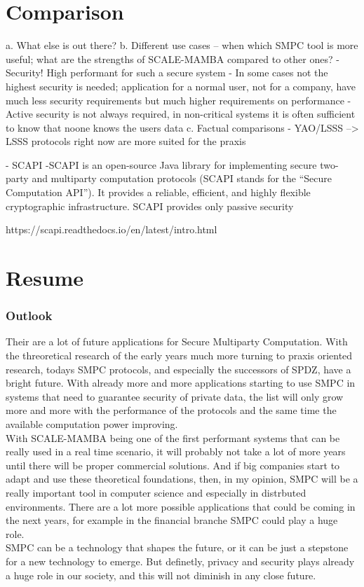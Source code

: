 \documentclass[english,runningheads,a4paper]{llncs}[2018/03/10]
\begin{document}
\section{Comparison}\label{sec:comparison}


a.	What else is out there?
b.	Different use cases – when which SMPC tool is more useful; what are the strengths of SCALE-MAMBA compared to other ones?
	- Security! High performant for such a secure system
	- In some cases not the highest security is needed; application for a normal user, not for a company, have much less security requirements but much higher requirements on performance
	- Active security is not always required, in non-critical systems it is often sufficient to know that noone knows the users data
c.	Factual comparisons
	- YAO/LSSS --> LSSS protocols right now are more suited for the praxis

	- SCAPI
	-SCAPI is an open-source Java library for implementing secure two-party and multiparty computation protocols (SCAPI stands for the “Secure Computation API”). It provides a reliable, 	efficient, and highly flexible cryptographic infrastructure.
SCAPI provides only passive security

https://scapi.readthedocs.io/en/latest/intro.html


\section{Resume}\label{sec:outlook}

\subsubsection{Outlook}
Their are a lot of future applications for Secure Multiparty Computation. With the threoretical research of the early years much more turning to praxis oriented research, todays SMPC protocols, and especially the successors of SPDZ, have a bright future. With already more and more applications starting to use SMPC in systems that need to guarantee security of private data, the list will only grow more and more with the performance of the protocols and the same time the available computation power improving. \\
With SCALE-MAMBA being one of the first performant systems that can be really used in a real time scenario, it will probably not take a lot of more years until there will be proper commercial solutions. And if big companies start to adapt and use these theoretical foundations, then, in my opinion, SMPC will be a really important tool in computer science and especially in distrbuted environments. There are a lot more possible applications that could be coming in the next years, for example in the financial branche SMPC could play a huge role.\\
SMPC can be a technology that shapes the future, or it can be just a stepstone for a new technology to emerge. But definetly, privacy and security plays already a huge role in our society, and this will not diminish in any close future.
\end{document}
